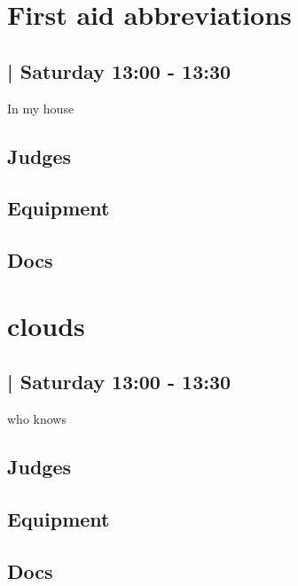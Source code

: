 \documentclass[10pt]{article}
\begin{document}
		\begin{minipage}{\linewidth}
		\setcounter{section}{26}
	\section{First aid abbreviations }
	\subsection*{ | Saturday 13:00 - 13:30}

	In my house

	\begin{multicols}{2}
	\subsection*{\faUsers \: Judges}
	\begin{itemize}
		\end{itemize}
	\columnbreak
	\subsection*{\faWrench \: Equipment}
	        \vfill\null
        \subsection*{\faFile \: Docs}
     	\end{multicols}


	\vspace{1cm}
	\end{minipage}

		\begin{minipage}{\linewidth}
		\setcounter{section}{27}
	\section{clouds }
	\subsection*{ | Saturday 13:00 - 13:30}

	who knows

	\begin{multicols}{2}
	\subsection*{\faUsers \: Judges}
	\begin{itemize}
		\end{itemize}
	\columnbreak
	\subsection*{\faWrench \: Equipment}
	        \vfill\null
        \subsection*{\faFile \: Docs}
     	\end{multicols}


	\vspace{1cm}
	\end{minipage}
\end{document}
